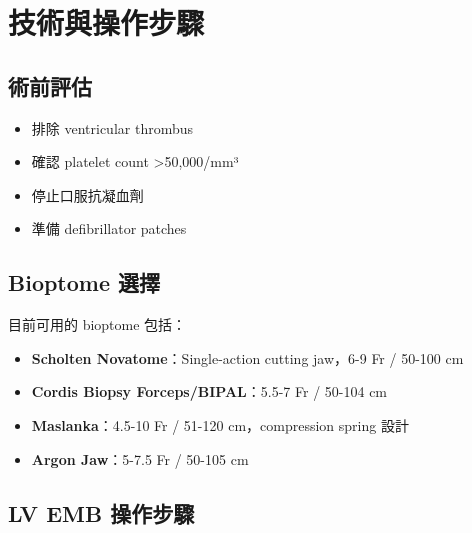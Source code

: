 \documentclass[12pt,a4paper]{article}
\begin{document}
\section{技術與操作步驟}

\subsection{術前評估}

\begin{itemize}
    \item 排除 ventricular thrombus
    \item 確認 platelet count >50,000/mm³
    \item 停止口服抗凝血劑
    \item 準備 defibrillator patches
\end{itemize}

\subsection{Bioptome 選擇}

目前可用的 bioptome 包括：
\begin{itemize}
    \item \textbf{Scholten Novatome}：Single-action cutting jaw，6-9 Fr / 50-100 cm
    \item \textbf{Cordis Biopsy Forceps/BIPAL}：5.5-7 Fr / 50-104 cm
    \item \textbf{Maslanka}：4.5-10 Fr / 51-120 cm，compression spring 設計
    \item \textbf{Argon Jaw}：5-7.5 Fr / 50-105 cm
\end{itemize}

\subsection{LV EMB 操作步驟}
\end{document}
